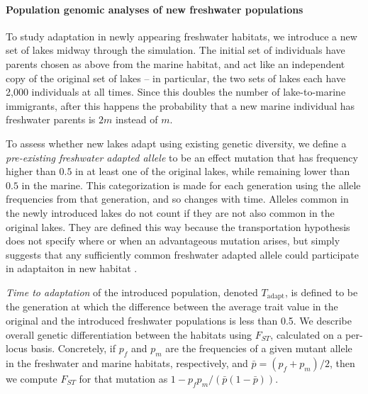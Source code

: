 \documentclass{article}
\begin{document}
\paragraph{Population genomic analyses of new freshwater populations} 
To study adaptation in newly appearing freshwater habitats, we introduce a new set of lakes midway through the simulation. 
The initial set of individuals have parents chosen as above from the marine habitat, 
and act like an independent copy of the original set of lakes -- in particular, 
the two sets of lakes each have 2,000 individuals at all times. 
Since this doubles the number of lake-to-marine immigrants, after this happens the probability that a new marine individual has freshwater parents is $2m$ instead of $m$.

To assess whether new lakes adapt using existing genetic diversity, we define a \emph{pre-existing freshwater adapted allele}
to be an effect mutation that has frequency higher than $0.5$ in at least one of the original lakes, while remaining lower than $0.5$ in the marine. 
This categorization is made for each generation using the allele frequencies from that generation, and so changes with time. Alleles common in the newly introduced lakes do not count
if they are not also common in the original lakes. 
They are defined this way because the transportation hypothesis does not specify where or when an advantageous mutation arises, 
but simply suggests that any sufficiently common freshwater adapted allele could participate in adaptaiton in new habitat \citep{schluter2009genetics}.

\emph{Time to adaptation} of the introduced population, denoted $T_\text{adapt}$, is defined to be the generation at which the difference between the average trait value in the original and the introduced freshwater populations is less than 0.5. 
We describe overall genetic differentiation between the habitats using $F_{ST}$,
calculated on a per-locus basis. Concretely, if $p_f$ and $p_m$ are the frequencies of a given mutant allele in the freshwater and marine habitats, respectively,
and $\bar p = (p_f + p_m)/2$, then we compute $F_{ST}$ for that mutation as $1 - p_f p_m / (\bar p (1-\bar p))$.
\end{document}

